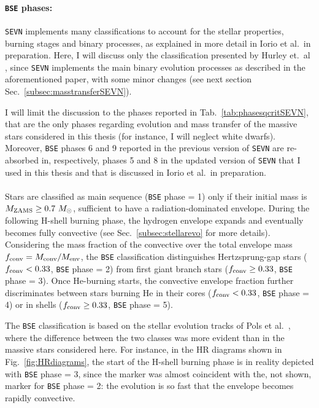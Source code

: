 \documentclass[a4paper,titlepage]{book}     	%
\newcommand{\sun}{\ensuremath{_\odot}}
\newcommand{\mzams}{M_\textup{ZAMS}}
\newcommand{\msun}{\ensuremath{M\sun}}
\begin{document}
\paragraph{\texttt{BSE} phases:} \texttt{SEVN} implements many classifications to account for the stellar properties, burning stages and binary processes, as explained in more detail in Iorio et al.\ in preparation. Here, I will discuss only the classification presented by Hurley et.\ al \cite{Hurley2002}, since \texttt{SEVN} implements the main binary evolution processes as described in the aforementioned paper, with some minor changes (see next section Sec.\ \ref{subsec:masstransferSEVN}). 

I will limit the discussion to the phases reported in Tab.\ \ref{tab:phasesqcritSEVN}, that are the only phases regarding evolution and mass transfer of the massive stars considered in this thesis (for instance, I will neglect white dwarfs). Moreover, \texttt{BSE} phases 6 and 9 reported in the previous version of \texttt{SEVN} \cite{spera2019_mergingBBH} are re-absorbed in, respectively, phases 5 and 8 in the updated version of \texttt{SEVN} that I used in this thesis and that is discussed in Iorio et al.\ in preparation.\\ 
\\

Stars are classified as main sequence (\texttt{BSE} phase = 1) only if their initial mass is $\mzams \geq 0.7~\msun$, sufficient to have a radiation-dominated envelope. During the following H-shell burning phase, the hydrogen envelope expands and eventually becomes fully convective (see Sec.\ \ref{subsec:stellarevo} for more details). Considering the mass fraction of the convective over the total envelope mass $f_{\rm conv}= M_{\rm conv}/M_{\rm env}$, the \texttt{BSE} classification distinguishes Hertzsprung-gap stars ($f_{\rm conv} < 0.33$, \texttt{BSE} phase = 2) from first giant branch stars ($f_{\rm conv} \geq 0.33$, \texttt{BSE} phase = 3).  Once He-burning starts, the convective envelope fraction further discriminates between stars burning He in their cores ($f_{\rm conv} < 0.33$, \texttt{BSE} phase = 4) or in shells ($f_{\rm conv} \geq 0.33$, \texttt{BSE} phase = 5).

The \texttt{BSE} classification is based on the stellar evolution tracks of Pols et al.\ \cite{Pols1998evotracks}, where the difference between the two classes was more evident than in the massive stars considered here. For instance, in the HR diagrams shown in Fig.\ \ref{fig:HRdiagrams}, the start of the H-shell burning phase is in reality depicted with \texttt{BSE} phase = 3, since the marker was almost coincident with the, not shown, marker for \texttt{BSE} phase = 2: the evolution is so fast that the envelope becomes rapidly convective. \\
\end{document}

